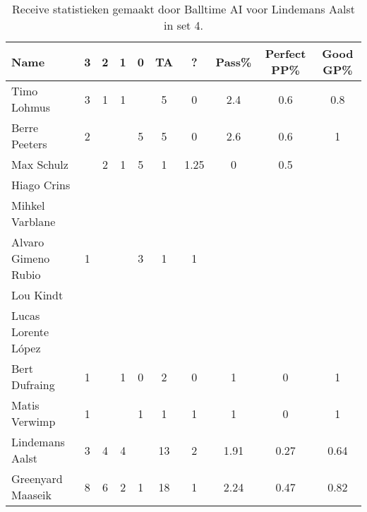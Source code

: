 \begin{table}[ht!]
  \centering
  \scriptsize
  \begin{tabular}{|l|c|c|c|c|c|c|c|c|c|} \hline
    \textbf{Name} & 3 & 2 & 1 & 0 & TA & ? & Pass\% & Perfect PP\% & Good GP\% \\ \hline
    Timo Lohmus & 3 & 1 & 1 &   & 5 & 0 & 2.4 & 0.6 & 0.8 \\
    Berre Peeters & 2 &   &   & 5 & 5 & 0 & 2.6 & 0.6 & 1 \\
    Max Schulz &   & 2 & 1 & 5 & 1 & 1.25 & 0 & 0.5 &   \\
    Hiago Crins &   &   &   &   &   &   &   &   &   \\
    Mihkel Varblane &   &   &   &   &   &   &   &   &   \\
    Alvaro Gimeno Rubio & 1 &   &   & 3 & 1 & 1 &   &   &   \\
    Lou Kindt &   &   &   &   &   &   &   &   &   \\
    Lucas Lorente López &   &   &   &   &   &   &   &   &   \\
    Bert Dufraing & 1 &   & 1 & 0 & 2 & 0 & 1 & 0 & 1 \\
    Matis Verwimp & 1 &   &   & 1 & 1 & 1 & 1 & 0 & 1 \\
    Lindemans Aalst & 3 & 4 & 4 &   & 13 & 2 & 1.91 & 0.27 & 0.64 \\
    Greenyard Maaseik & 8 & 6 & 2 & 1 & 18 & 1 & 2.24 & 0.47 & 0.82 \\ \hline
  \end{tabular}
  \caption[Receive statistieken gemaakt door Balltime AI voor Lindemans Aalst in set 4]{\label{tab:PL3ReceiveAalst4}Receive statistieken gemaakt door Balltime AI voor Lindemans Aalst in set 4.}
\end{table}


